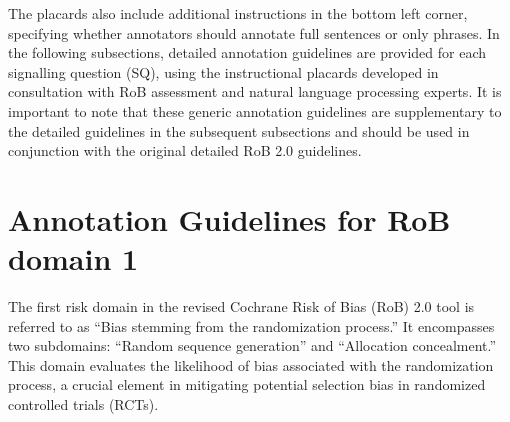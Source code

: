 \documentclass[sn-mathphys,Numbered]{sn-jnl}%
\begin{document}
%
%
%
The placards also include additional instructions in the bottom left corner, specifying whether annotators should annotate full sentences or only phrases.
In the following subsections, detailed annotation guidelines are provided for each signalling question (SQ), using the instructional placards developed in consultation with RoB assessment and natural language processing experts.
It is important to note that these generic annotation guidelines are supplementary to the detailed guidelines in the subsequent subsections and should be used in conjunction with the original detailed RoB 2.0 guidelines.
%
%
%
\section*{Annotation Guidelines for RoB domain 1}
\label{sec:dom1}
%
The first risk domain in the revised Cochrane Risk of Bias (RoB) 2.0 tool is referred to as ``Bias stemming from the randomization process.'' It encompasses two subdomains: ``Random sequence generation'' and ``Allocation concealment.''
This domain evaluates the likelihood of bias associated with the randomization process, a crucial element in mitigating potential selection bias in randomized controlled trials (RCTs).
%
%
%
\end{document}

